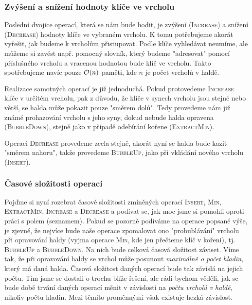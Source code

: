 \subsubsection{Zvýšení a snížení hodnoty klíče ve vrcholu}

Poslední dvojice operací, která se nám bude hodit, je zvýšení (\textsc{Increase}) a snížení (\textsc{Decrease}) hodnoty klíče ve vybraném vrcholu. K tomu potřebujeme akorát vyřešit, jak budeme k vrcholům přistupovat. Podle klíče vyhledávat neumíme, ale můžeme si zavést např. pomocný slovník, který budeme "adresovat" pomocí příslušného vrcholu a vracenou hodnotou bude klíč ve vrcholu. Takto spotřebujeme navíc pouze $\mathcal{O}(n)$ paměti, kde $n$ je počet vrcholů v haldě.

Realizace samotných operací je již jednoduchá. Pokud protovedeme \textsc{Increase} klíče v určitém vrcholu, pak z důvodu, že klíče v synech vrcholu jsou stejné nebo větší, se halda může pokazit pouze "směrem dolů". Tedy provedeme nám již známé prohazování vrcholu s jeho syny, dokud nebude halda opravena (\textsc{BubbleDown}), stejně jako v případě odebírání kořene (\textsc{ExtractMin}).

Operaci \textsc{Decrease} provedeme zcela stejně, akorát nyní se halda bude kazit "směrem nahoru", takže provedeme \textsc{BubbleUp}, jako při vkládání nového vrcholu (\textsc{Insert}).

\subsubsection{Časové složitosti operací}

Pojďme si nyní rozebrat časové složitosti zmíněných operací \textsc{Insert}, \textsc{Min}, \textsc{ExtractMin}, \textsc{Increase} a \textsc{Decrease} a podívat se, jak moc jsme si pomohli oproti práci s polem (seznamem). Pokud se pozorně podíváme na operace popsané výše, je zjevné, že nejvíce bude naše operace zpomalovat ono "probublávání" vrcholu při opravování haldy (vyjma operace \textsc{Min}, kde jen přečteme klíč v kořeni), tj. \textsc{BubbleUp} a \textsc{BubbleDown}. Na nich bude celková časová složitost záviset.
Víme tak, že při opravování haldy se vrchol může posunout \emph{maximálně o počet hladin}, který má daná halda. Časová složitost daných operací bude tak závislá na jejich počtu. Tím jsme se dostali o trochu blíže řešení, ale rádi bychom věděli, jak se bude době trvání daných operací měnit v závislosti na \emph{počtu vrcholů v haldě}, nikoliv počtu hladin. Mezi těmito proměnnými však existuje hezká závislost.

